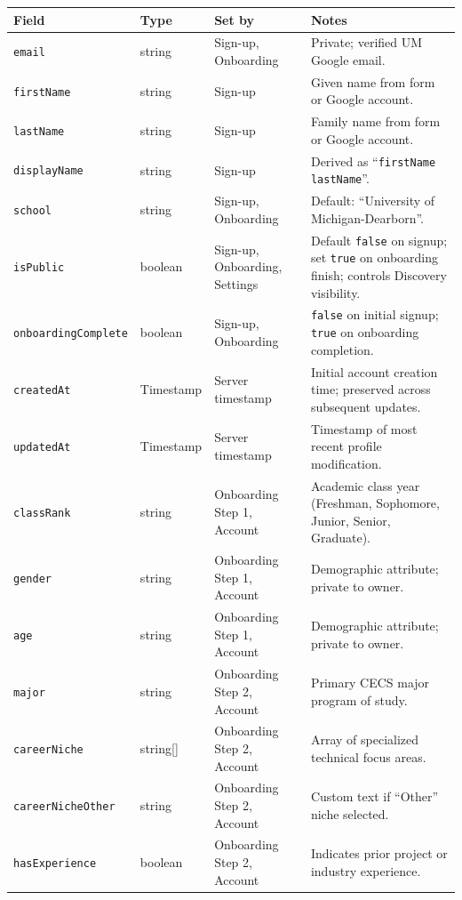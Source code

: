 \documentclass[11pt,letterpaper]{article}
\begin{document}
\begin{table}[h!]
\centering
\small
\begin{tabularx}{\textwidth}{p{3.3cm} p{1.8cm} p{3.0cm} Y}
\toprule
\textbf{Field} & \textbf{Type} & \textbf{Set by} & \textbf{Notes} \\
\midrule
\texttt{email} & string & Sign-up, Onboarding & Private; verified UM Google email. \\
\texttt{firstName} & string & Sign-up & Given name from form or Google account. \\
\texttt{lastName} & string & Sign-up & Family name from form or Google account. \\
\texttt{displayName} & string & Sign-up & Derived as ``\texttt{firstName lastName}''. \\
\texttt{school} & string & Sign-up, Onboarding & Default: ``University of Michigan-Dearborn''. \\
\texttt{isPublic} & boolean & Sign-up, Onboarding, Settings & Default \texttt{false} on signup; set \texttt{true} on onboarding finish; controls Discovery visibility. \\
\texttt{onboardingComplete} & boolean & Sign-up, Onboarding & \texttt{false} on initial signup; \texttt{true} on onboarding completion. \\
\texttt{createdAt} & Timestamp & Server timestamp & Initial account creation time; preserved across subsequent updates. \\
\texttt{updatedAt} & Timestamp & Server timestamp & Timestamp of most recent profile modification. \\
\texttt{classRank} & string & Onboarding Step 1, Account & Academic class year (Freshman, Sophomore, Junior, Senior, Graduate). \\
\texttt{gender} & string & Onboarding Step 1, Account & Demographic attribute; private to owner. \\
\texttt{age} & string & Onboarding Step 1, Account & Demographic attribute; private to owner. \\
\texttt{major} & string & Onboarding Step 2, Account & Primary CECS major program of study. \\
\texttt{careerNiche} & string[] & Onboarding Step 2, Account & Array of specialized technical focus areas. \\
\texttt{careerNicheOther} & string & Onboarding Step 2, Account & Custom text if ``Other'' niche selected. \\
\texttt{hasExperience} & boolean & Onboarding Step 2, Account & Indicates prior project or industry experience. \\

\end{tabularx}
\end{table}
\end{document}
